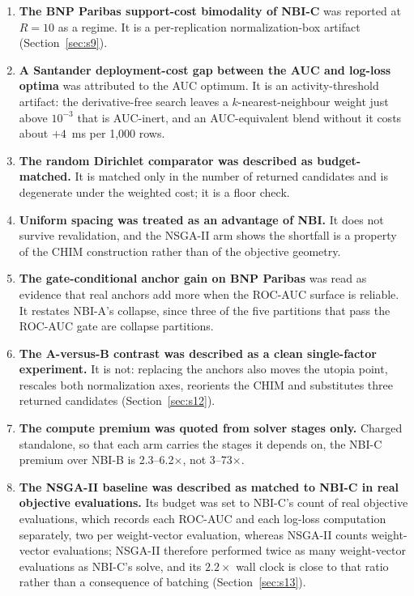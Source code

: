 \documentclass[11pt,a4paper]{article}
\begin{document}
\begin{enumerate}
\item \textbf{The BNP Paribas support-cost bimodality of NBI-C} was reported at $R = 10$ as a regime. It is a
per-replication normalization-box artifact (Section~\ref{sec:s9}).
\item \textbf{A Santander deployment-cost gap between the AUC and log-loss optima} was attributed to the AUC optimum.
It is an activity-threshold artifact: the derivative-free search leaves a $k$-nearest-neighbour weight just above
$10^{-3}$ that is AUC-inert, and an AUC-equivalent blend without it costs about $+4$~ms per 1{,}000 rows.
\item \textbf{The random Dirichlet comparator was described as budget-matched.} It is matched only in the number of
returned candidates and is degenerate under the weighted cost; it is a floor check.
\item \textbf{Uniform spacing was treated as an advantage of NBI.} It does not survive revalidation, and the
NSGA-II arm shows the shortfall is a property of the CHIM construction rather than of the objective geometry.
\item \textbf{The gate-conditional anchor gain on BNP Paribas} was read as evidence that real anchors add more when
the ROC-AUC surface is reliable. It restates NBI-A's collapse, since three of the five partitions that pass the
ROC-AUC gate are collapse partitions.
\item \textbf{The A-versus-B contrast was described as a clean single-factor experiment.} It is not: replacing the
anchors also moves the utopia point, rescales both normalization axes, reorients the CHIM and substitutes three
returned candidates (Section~\ref{sec:s12}).
\item \textbf{The compute premium was quoted from solver stages only.} Charged standalone, so that each arm carries
the stages it depends on, the NBI-C premium over NBI-B is 2.3--6.2$\times$, not 3--73$\times$.
\item \textbf{The NSGA-II baseline was described as matched to NBI-C in real objective evaluations.} Its budget was
set to NBI-C's count of real objective evaluations, which records each ROC-AUC and each log-loss computation
separately, two per weight-vector evaluation, whereas NSGA-II counts weight-vector evaluations; NSGA-II therefore
performed twice as many weight-vector evaluations as NBI-C's solve, and its $2.2\times$ wall clock is close to that
ratio rather than a consequence of batching (Section~\ref{sec:s13}).
\end{enumerate}
\end{document}
